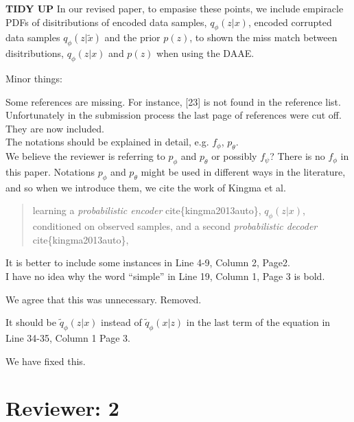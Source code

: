 \documentclass{article}
\begin{document}
{\color{red} \textbf{TIDY UP} In our revised paper, to empasise these points, we include empiracle PDFs of disitributions of encoded data samples, $q_\phi(z|x)$, encoded corrupted data samples $q_\phi(z|\tilde{x})$ and the prior $p(z)$, to shown the miss match between disitributions, $q_\phi(z|x)$ and $p(z)$ when using the DAAE.}


Minor things: \newline

{\color{blue}
Some references are missing. For instance, [23] is not found in the reference list.}\\

Unfortunately in the submission process the last page of references were cut off. They are now included.\\

{\color{blue}
The notations should be explained in detail, e.g. $f_\phi$, $p_\theta$.} \\

We believe the reviewer is referring to $p_\phi$ and $p_\theta$ or possibly $f_\psi$? There is no $f_\phi$ in this paper. Notations $p_\phi$ and $p_\theta$ might be used in different ways in the literature, and so when we introduce them, we cite the work of Kingma et al.\\

\begin{quote}
    learning a \textit{probabilistic encoder} cite\{kingma2013auto\}, $q_\phi(z|x)$, conditioned on observed samples, and a second \textit{probabilistic decoder} cite\{kingma2013auto\},
\end{quote} 

{\color{blue}
It is better to include some instances in Line 4-9, Column 2, Page2.}\\

{\color{blue}
I have no idea why the word “simple” in Line 19, Column 1, Page 3 is bold.}\newline

We agree that this was unnecessary.  Removed.

{\color{blue}
It should be $\tilde q_\phi(z|x)$ instead of $\tilde q_\phi(x|z)$ in the last term of the equation in Line 34-35, Column 1 Page 3. }

We have fixed this.


\section{Reviewer: 2}
\end{document}
